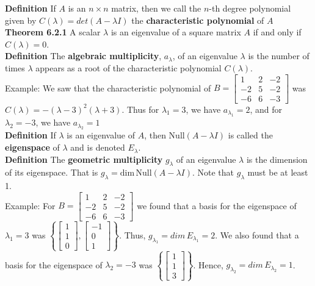 \documentclass[10pt,letter]{article}
\begin{document}
\textbf{Definition} If $A$ is an $n\times n$ matrix, then we call the $n$-th degree polynomial given by $C(\lambda)=det(A-\lambda I)$ the \textbf{characteristic polynomial} of $A$\\ 
\textbf{Theorem 6.2.1} A scalar $\lambda$ is an eigenvalue of a square matrix $A$ if and only if $C(\lambda)=0$. \\ 
\textbf{Definition} The \textbf{algebraic multiplicity}, $a_\lambda$, of an eigenvalue $\lambda$ is the number of times $\lambda$ appears as a root of the characteristic polynomial $C(\lambda)$. \\ 
Example: We saw that the characteristic polynomial of $B=\begin{bmatrix}1&2&-2\\-2&5&-2\\-6&6&-3\end{bmatrix}$ was $C(\lambda)=-(\lambda-3)^2(\lambda+3)$. Thus for $\lambda_1=3$, we have $a_{\lambda_1}=2$, and for $\lambda_2=-3$, we have $a_{\lambda_2}=1$ \\ 
\textbf{Definition} If $\lambda$ is an eigenvalue of $A$, then Null$(A-\lambda I)$ is called the \textbf{eigenspace} of $\lambda$ and is denoted $E_\lambda$. \\ 
\textbf{Definition} The \textbf{geometric multiplicity} $g_\lambda$ of an eigenvalue $\lambda$ is the dimension of its eigenspace. That is $g_\lambda=\text{dim}\,\text{Null}(A-\lambda I)$. Note that $g_\lambda$ must be at least 1. \\ 
Example: For $B=\begin{bmatrix}1&2&-2\\-2&5&-2\\-6&6&-3\end{bmatrix}$ we found that a basis for the eigenspace of $\lambda_1=3$ was $\left\{\begin{bmatrix}1\\1\\0\end{bmatrix},\begin{bmatrix}-1\\0\\1\end{bmatrix}\right\}$. Thus, $g_{\lambda_1}=dim\,E_{\lambda_1}=2$. We also found that a basis for the eigenspace of $\lambda_2=-3$ was $\left\{\begin{bmatrix}1\\1\\3\end{bmatrix}\right\}$. Hence, $g_{\lambda_2}=dim\,E_{\lambda_2}=1$. \\ 
\end{document}

